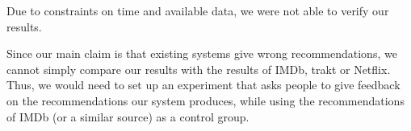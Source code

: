Due to constraints on time and available data, we were not able to verify our results.

Since our main claim is that existing systems give wrong recommendations, we cannot simply compare our results with the results of IMDb, trakt or Netflix.
Thus, we would need to set up an experiment that asks people to give feedback on the recommendations our system produces, while using the recommendations of IMDb (or a similar source) as a control group.

